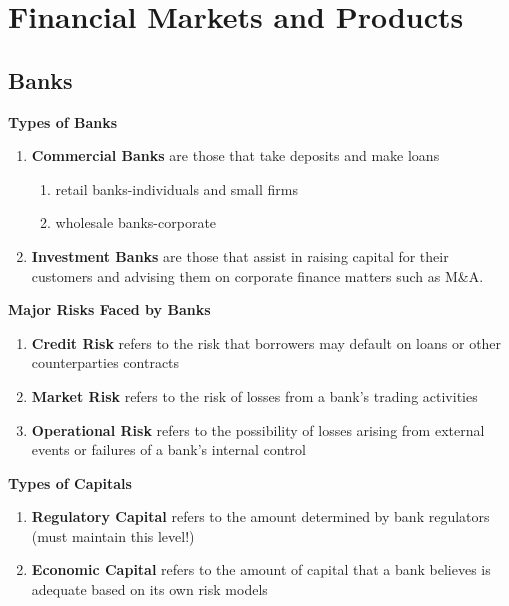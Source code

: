 \documentclass[11pt,fleqn]{report} %
\numberwithin{equation}{section} %
\numberwithin{figure}{section} %
\numberwithin{table}{section} %
\begin{document}

\pagestyle{empty} %

\tableofcontents %

\pagestyle{fancy} %


\part{Financial Markets and Products}
\chapter{Banks}
\begin{definition}\textbf{Types of Banks}
\begin{enumerate}
    \item \textbf{Commercial Banks} are those that take deposits and make loans
    \begin{enumerate}
        \item retail banks-individuals and small firms
        \item wholesale banks-corporate
    \end{enumerate}
    \item \textbf{Investment Banks} are those that assist in raising capital for their customers and advising them on corporate finance matters such as M\&A.
\end{enumerate}
\end{definition}
\begin{definition}\textbf{Major Risks Faced by Banks}
\begin{enumerate}
    \item \textbf{Credit Risk} refers to the risk that borrowers may default on loans or other counterparties contracts
    \item \textbf{Market Risk} refers to the risk of losses from a bank's trading activities
    \item \textbf{Operational Risk} refers to the possibility of losses arising from external events or failures of a bank's internal control
\end{enumerate}
\end{definition}
\begin{definition}\textbf{Types of Capitals}
\begin{enumerate}
    \item \textbf{Regulatory Capital} refers to the amount determined by bank regulators (must maintain this level!)
    \item \textbf{Economic Capital} refers to the amount of capital that a bank believes is adequate based on its own risk models
\end{enumerate}
\end{definition}
\end{document}
